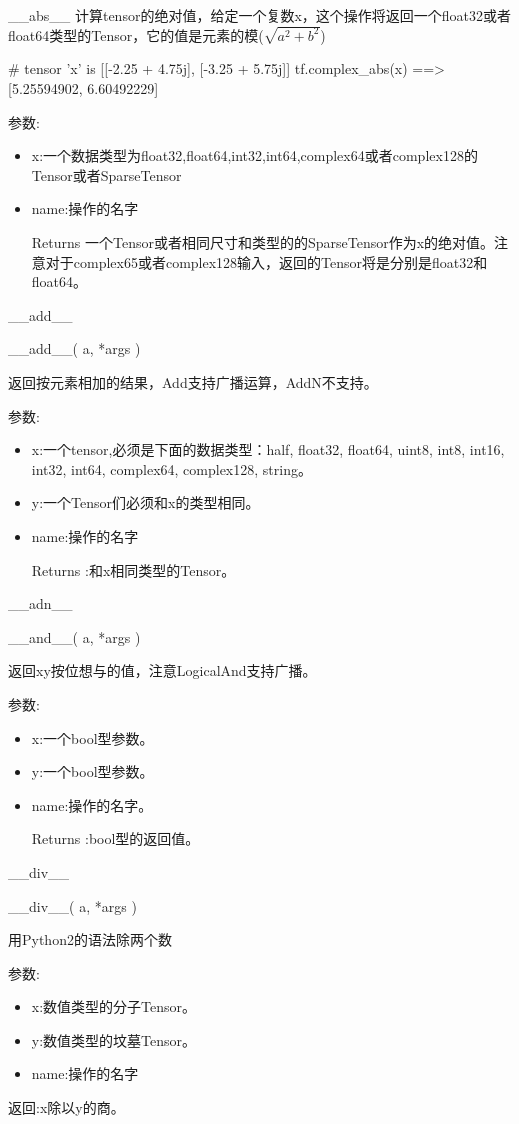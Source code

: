 \_\_abs\_\_
计算tensor的绝对值，给定一个复数x，这个操作将返回一个float32或者float64类型的Tensor，它的值是元素的模($\sqrt{a^2+b^2}$)
\begin{python}
# tensor 'x' is [[-2.25 + 4.75j], [-3.25 + 5.75j]]
tf.complex_abs(x) ==> [5.25594902, 6.60492229]
\end{python}
参数:
\begin{itemize}
	\item x:一个数据类型为float32,float64,int32,int64,complex64或者complex128的Tensor或者SparseTensor
	\item name:操作的名字
	\item[Returns]一个Tensor或者相同尺寸和类型的的SparseTensor作为x的绝对值。注意对于complex65或者complex128输入，返回的Tensor将是分别是float32和float64。
\end{itemize}
\_\_add\_\_\newline
\begin{python}
__add__(
    a,
    *args
)
\end{python}
返回按元素相加的结果，Add支持广播运算，AddN不支持。

参数:
\begin{itemize}
	\item x:一个tensor,必须是下面的数据类型：half, float32, float64, uint8, int8, int16, int32, int64, complex64, complex128, string。
	\item y:一个Tensor们必须和x的类型相同。
	\item name:操作的名字
	\item[Returns]:和x相同类型的Tensor。
\end{itemize}
\_\_adn\_\_\newline
\begin{python}
__and__(
    a,
    *args
)
\end{python}
返回xy按位想与的值，注意LogicalAnd支持广播。

参数:
\begin{itemize}
	\item x:一个bool型参数。
	\item y:一个bool型参数。
	\item name:操作的名字。
	\item[Returns]:bool型的返回值。
\end{itemize}
\_\_div\_\_\newline
\begin{python}
__div__(
    a,
    *args
)
\end{python}
用Python2的语法除两个数

参数:
\begin{itemize}
	\item x:数值类型的分子Tensor。
	\item y:数值类型的坟墓Tensor。
	\item name:操作的名字
\end{itemize}
返回:x除以y的商。


